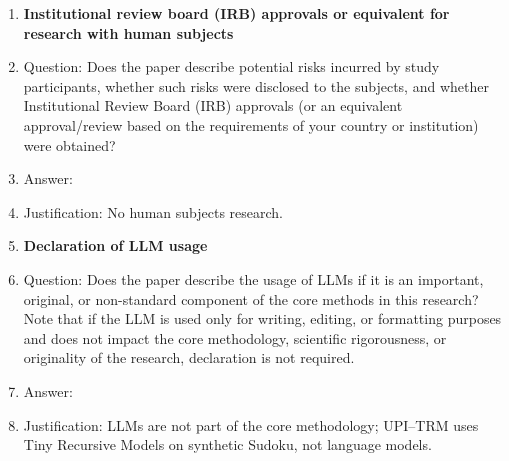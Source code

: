 \documentclass{article}
\theoremstyle{plain}
\theoremstyle{definition}
\theoremstyle{remark}
\begin{document}
\begin{enumerate}[leftmargin=*,itemsep=0.35em,topsep=0.35em]
\item {\bf Institutional review board (IRB) approvals or equivalent for research with human subjects}
    \item[] Question: Does the paper describe potential risks incurred by study participants, whether such risks were disclosed to the subjects, and whether Institutional Review Board (IRB) approvals (or an equivalent approval/review based on the requirements of your country or institution) were obtained?
    \item[] Answer: \answerNA{}
    \item[] Justification: No human subjects research.

\item {\bf Declaration of LLM usage}
    \item[] Question: Does the paper describe the usage of LLMs if it is an important, original, or non-standard component of the core methods in this research? Note that if the LLM is used only for writing, editing, or formatting purposes and does not impact the core methodology, scientific rigorousness, or originality of the research, declaration is not required.
    \item[] Answer: \answerNA{}
    \item[] Justification: LLMs are not part of the core methodology; UPI--TRM uses Tiny Recursive Models on synthetic Sudoku, not language models.

\end{enumerate}
\normalsize
\end{document}
